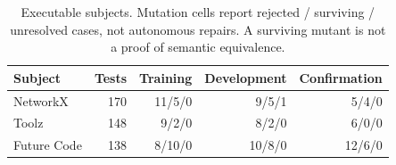 \begin{table}[t]
\centering\small
\caption{Executable subjects. Mutation cells report rejected / surviving / unresolved cases, not autonomous repairs. A surviving mutant is not a proof of semantic equivalence.}\label{tab:cohort}
\begin{tabular}{@{}lrrrr@{}}
\toprule
Subject & Tests & Training & Development & Confirmation\\
\midrule
NetworkX & 170 & 11/5/0 & 9/5/1 & 5/4/0\\
Toolz & 148 & 9/2/0 & 8/2/0 & 6/0/0\\
Future Code & 138 & 8/10/0 & 10/8/0 & 12/6/0\\
\bottomrule
\end{tabular}
\end{table}
